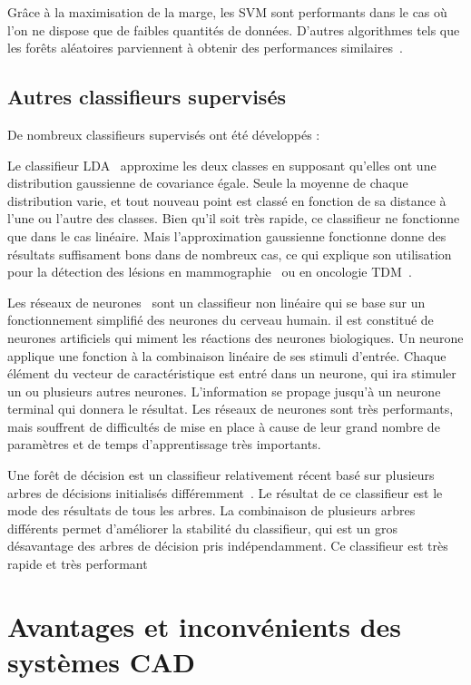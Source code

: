 Grâce à la maximisation de la marge, les SVM sont performants dans le cas où l'on ne dispose que de faibles quantités de données. D'autres algorithmes tels que les forêts aléatoires parviennent à obtenir des performances similaires~\cite{statnikov2008comprehensive}.

\subsection{Autres classifieurs supervisés}

De nombreux classifieurs supervisés ont été développés :

\label{lab:LDA}
Le classifieur LDA~\cite{fisher1936use} approxime les deux classes en supposant qu'elles ont une distribution gaussienne de covariance égale. Seule la moyenne de chaque distribution varie, et tout nouveau point est classé en fonction de sa distance à l'une ou l'autre des classes. Bien qu'il soit très rapide, ce classifieur ne fonctionne que dans le cas linéaire. Mais l'approximation gaussienne fonctionne donne des résultats suffisament bons dans de nombreux cas, ce qui explique son utilisation pour la détection des lésions en mammographie~\cite{baydush2007incorporation} ou en oncologie TDM~\cite{gurcan2002lung}.


Les réseaux de neurones~\cite{haykin1999neural} sont un classifieur non linéaire qui se base sur un fonctionnement simplifié des neurones du cerveau humain. il est constitué de neurones artificiels qui miment les réactions des neurones biologiques. Un neurone applique une fonction à la combinaison linéaire de ses stimuli d'entrée. Chaque élément du vecteur de caractéristique est entré dans un neurone, qui ira stimuler un ou plusieurs autres neurones. L'information se propage jusqu'à un neurone terminal qui donnera le résultat. Les réseaux de neurones sont très performants, mais souffrent de difficultés de mise en place à cause de leur grand nombre de paramètres et de temps d'apprentissage très importants.

Une forêt de décision est un classifieur relativement récent basé sur plusieurs arbres de décisions initialisés différemment~\cite{ho1998random}. Le résultat de ce classifieur est le mode des résultats de tous les arbres. La combinaison de plusieurs arbres différents permet d'améliorer la stabilité du classifieur, qui est un gros désavantage des arbres de décision pris indépendamment. Ce classifieur est très rapide et très performant

\section{Avantages et inconvénients des systèmes CAD}

